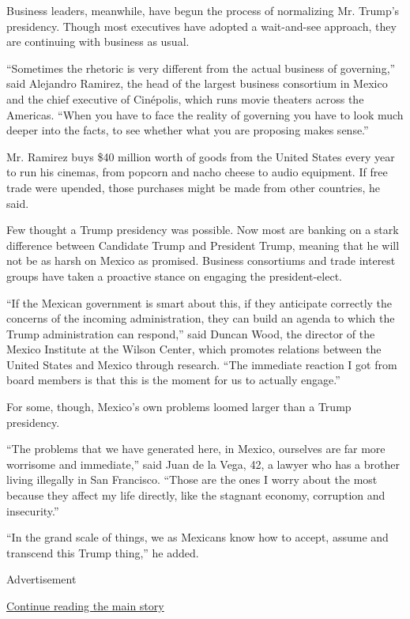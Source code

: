 Business leaders, meanwhile, have begun the process of normalizing Mr.
Trump's presidency. Though most executives have adopted a wait-and-see
approach, they are continuing with business as usual.

``Sometimes the rhetoric is very different from the actual business of
governing,'' said Alejandro Ramirez, the head of the largest business
consortium in Mexico and the chief executive of Cinépolis, which runs
movie theaters across the Americas. ``When you have to face the reality
of governing you have to look much deeper into the facts, to see whether
what you are proposing makes sense.''

Mr. Ramirez buys \$40 million worth of goods from the United States
every year to run his cinemas, from popcorn and nacho cheese to audio
equipment. If free trade were upended, those purchases might be made
from other countries, he said.

Few thought a Trump presidency was possible. Now most are banking on a
stark difference between Candidate Trump and President Trump, meaning
that he will not be as harsh on Mexico as promised. Business consortiums
and trade interest groups have taken a proactive stance on engaging the
president-elect.

``If the Mexican government is smart about this, if they anticipate
correctly the concerns of the incoming administration, they can build an
agenda to which the Trump administration can respond,'' said Duncan
Wood, the director of the Mexico Institute at the Wilson Center, which
promotes relations between the United States and Mexico through
research. ``The immediate reaction I got from board members is that this
is the moment for us to actually engage.''

For some, though, Mexico's own problems loomed larger than a Trump
presidency.

``The problems that we have generated here, in Mexico, ourselves are far
more worrisome and immediate,'' said Juan de la Vega, 42, a lawyer who
has a brother living illegally in San Francisco. ``Those are the ones I
worry about the most because they affect my life directly, like the
stagnant economy, corruption and insecurity.''

``In the grand scale of things, we as Mexicans know how to accept,
assume and transcend this Trump thing,'' he added.

Advertisement

\protect\hyperlink{after-bottom}{Continue reading the main story}

